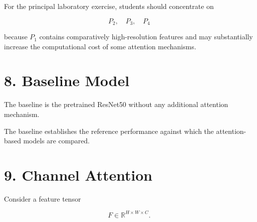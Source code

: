 \documentclass[10pt]{article}
\begin{document}
For the principal laboratory exercise, students should concentrate on

\[
\boxed{
P_2,\quad P_3,\quad P_4
}
\]

because $P_1$ contains comparatively high-resolution features and may
substantially increase the computational cost of some attention mechanisms.

\section*{8. Baseline Model}

The baseline is the pretrained ResNet50 without any additional attention
mechanism.

\begin{center}


\end{center}

The baseline establishes the reference performance against which the
attention-based models are compared.

\section*{9. Channel Attention}

Consider a feature tensor

\[
F\in\mathbb{R}^{H\times W\times C}.
\]
\end{document}

